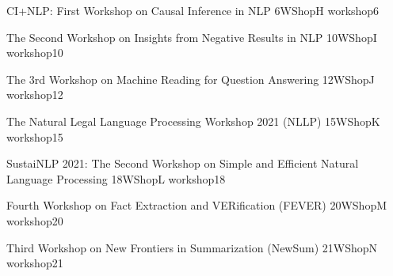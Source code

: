 

\begin{wsschedule}
  {CI+NLP: First Workshop on Causal Inference in NLP}
  {6}{WShopH}
  {workshop6}
  {\WShopLocG}
  
\end{wsschedule}

\begin{wsschedule}
  {The Second Workshop on Insights from Negative Results in NLP}
  {10}{WShopI}
  {workshop10}
  {\WShopLocH}
  
\end{wsschedule}

\begin{wsschedule}
  {The 3rd Workshop on Machine Reading for Question Answering}
  {12}{WShopJ}
  {workshop12}
  {\WShopLocH}
  
\end{wsschedule}

\begin{wsschedule}
  {The Natural Legal Language Processing Workshop 2021 (NLLP) }
  {15}{WShopK}
  {workshop15}
  {\WShopLocH}
  
\end{wsschedule}

\begin{wsschedule}
  {SustaiNLP 2021: The Second Workshop on Simple and Efficient Natural Language Processing}
  {18}{WShopL}
  {workshop18}
  {\WShopLocH}
  
\end{wsschedule}

\begin{wsschedule}
  {Fourth Workshop on Fact Extraction and VERification (FEVER)}
  {20}{WShopM}
  {workshop20}
  {\WShopLocH}
  
\end{wsschedule}

\begin{wsschedule}
  {Third Workshop on New Frontiers in Summarization (NewSum)}
  {21}{WShopN}
  {workshop21}
  {\WShopLocH}
  
\end{wsschedule}


